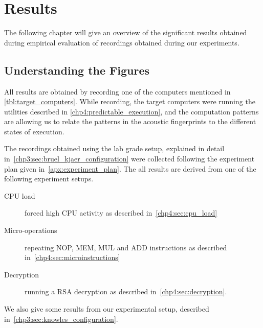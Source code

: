 \chapter{Results}
\label{chp5:results}
The following chapter will give an overview of the significant results obtained during empirical evaluation of recordings obtained during our experiments.

\section{Understanding the Figures}
All results are obtained by recording one of the computers mentioned in \autoref{tbl:target_computers}.
While recording, the target computers were running the utilities described in \autoref{chp4:predictable_execution}, and the computation patterns are allowing us to relate the 
patterns in the acoustic fingerprints to the different states of execution.

The recordings obtained using the lab grade setup, explained in detail in~\autoref{chp3:sec:bruel_kjaer_configuration}  were collected following the experiment plan given in~\autoref{apx:experiment_plan}. 
The all results are derived from one of the following experiment setups.

\begin{description}
    \item[CPU load] forced high CPU activity as described in~\autoref{chp4:sec:cpu_load}
    \item[Micro-operations] repeating NOP, MEM, MUL and ADD instructions as described in~\autoref{chp4:sec:microinstructions}
    \item[Decryption] running a RSA decryption as described in~\autoref{chp4:sec:decryption}.
\end{description}

We also give some results from our experimental setup, described in~\autoref{chp3:sec:knowles_configuration}.


